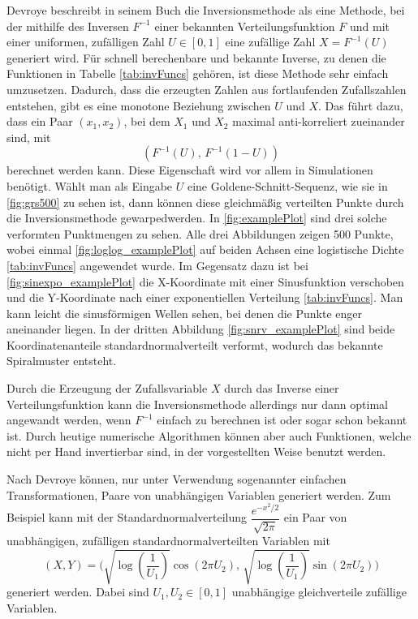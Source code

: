 Devroye \cite{devroye-non_uniform_random_variate-1986} beschreibt in seinem Buch 
die Inversionsmethode als eine Methode, bei der mithilfe des Inversen $F^{-1}$ 
einer bekannten Verteilungsfunktion $F$ und mit einer uniformen, zufälligen Zahl 
$U \in [0, 1]$ eine zufällige Zahl $X = F^{-1}(U)$ generiert wird. Für schnell 
berechenbare und bekannte Inverse, zu denen die Funktionen in Tabelle 
\ref{tab:invFuncs} gehören, ist diese Methode sehr einfach umzusetzen. Dadurch, 
dass die erzeugten Zahlen aus fortlaufenden Zufallszahlen entstehen, gibt es eine 
monotone Beziehung zwischen $U$ und $X$. Das führt dazu, dass ein Paar 
$(x_1, x_2)$, bei dem $X_1$ und $X_2$ maximal anti-korreliert zueinander sind, mit 
\begin{equation}
    (F^{-1}(U),\, F^{-1}(1 - U))
\end{equation}
berechnet werden kann. Diese Eigenschaft wird vor allem in Simulationen benötigt.
Wählt man als Eingabe $U$ eine Goldene-Schnitt-Sequenz, wie sie in \ref{fig:grs500} 
zu sehen ist, dann können diese gleichmäßig verteilten Punkte durch die 
Inversionsmethode \glqq gewarped\grqq werden. In \ref{fig:examplePlot} sind drei solche 
verformten Punktmengen zu sehen. Alle drei Abbildungen zeigen 500 Punkte, wobei 
einmal \ref{fig:loglog_examplePlot} auf beiden Achsen eine logistische Dichte \ref{tab:invFuncs} angewendet wurde. 
Im Gegensatz dazu ist bei \ref{fig:sinexpo_examplePlot} die X-Koordinate mit einer 
Sinusfunktion verschoben und die Y-Koordinate nach einer exponentiellen Verteilung \ref{tab:invFuncs}.
Man kann leicht die sinusförmigen Wellen sehen, bei denen die Punkte enger aneinander liegen. 
In der  dritten Abbildung \ref{fig:snrv_examplePlot} sind beide Koordinatenanteile standardnormalverteilt
verformt, wodurch das bekannte Spiralmuster entsteht. 

Durch die Erzeugung der Zufallsvariable $X$ durch das Inverse einer 
Verteilungsfunktion kann die Inversionsmethode allerdings nur dann optimal 
angewandt werden, wenn $F^{-1}$ einfach zu berechnen ist oder sogar schon bekannt 
ist. Durch heutige numerische Algorithmen können aber auch Funktionen, welche 
nicht \glqq per Hand\grqq{} invertierbar sind, in der vorgestellten Weise benutzt 
werden. 

Nach Devroye können, nur unter Verwendung sogenannter \glqq einfachen 
Transformationen\grqq, Paare von unabhängigen Variablen generiert werden. Zum 
Beispiel kann mit der Standardnormalverteilung $\dfrac{e^{-x^2/2}}{\sqrt{2\pi}}$ 
ein Paar von unabhängigen, zufälligen standardnormalverteilten Variablen mit 
\begin{equation}
    (X, Y) = \bigg( \sqrt{\log(\dfrac{1}{U_1})}\cos(2\pi U_2),\, \sqrt{\log(
        \dfrac{1}{U_1})}\sin(2\pi U_2) \bigg)
    \label{eq:stdnormdensity}
\end{equation}
generiert werden. Dabei sind $U_1, U_2 \in [0, 1]$ unabhängige gleichverteile 
zufällige Variablen.

